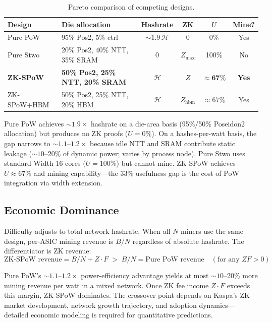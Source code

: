 \documentclass[11pt,a4paper]{article}
\begin{document}
\begin{table}[h]
\centering
\small
\begin{tabular}{@{}llcccc@{}}
\toprule
Design & Die allocation & Hashrate & ZK & $U$ & Mine? \\
\midrule
Pure PoW & 95\% Pos2, 5\% ctrl & ${\sim}1.9\,\mathcal{H}$ & 0 & 0\% & Yes \\
Pure Stwo & 20\% Pos2, 40\% NTT, 35\% SRAM & 0 & $Z_{\max}$ & 100\% & No \\
\textbf{ZK-SPoW} & \textbf{50\% Pos2, 25\% NTT, 20\% SRAM} & $\mathcal{H}$ & $Z$ & $\mathbf{{\approx}67\%}$ & \textbf{Yes} \\
ZK-SPoW+HBM & 50\% Pos2, 25\% NTT, 20\% HBM & $\mathcal{H}$ & $Z_{\mathrm{hbm}}$ & ${\approx}67\%$ & Yes \\
\bottomrule
\end{tabular}
\caption{Pareto comparison of competing designs.}
\label{tab:pareto}
\end{table}

Pure PoW achieves ${\sim}1.9\times$ hashrate on a die-area basis (95\%/50\% Poseidon2 allocation) but produces no ZK proofs ($U = 0\%$). On a hashes-per-watt basis, the gap narrows to ${\sim}1.1$--$1.2\times$ because idle NTT and SRAM contribute static leakage (${\sim}10$--$20\%$ of dynamic power; varies by process node). Pure Stwo uses standard Width-16 cores ($U = 100\%$) but cannot mine. ZK-SPoW achieves $U \approx 67\%$ and mining capability---the 33\% usefulness gap is the cost of PoW integration via width extension.

\subsection{Economic Dominance}
\label{sec:econ}

Difficulty adjusts to total network hashrate. When all $N$ miners use the same design, per-ASIC mining revenue is $B/N$ regardless of absolute hashrate. The differentiator is ZK revenue:
\[
\text{ZK-SPoW revenue} = B/N + Z \cdot F \;>\; B/N = \text{Pure PoW revenue} \quad (\text{for any } ZF > 0)
\]

Pure PoW's ${\sim}1.1$--$1.2\times$ power-efficiency advantage yields at most ${\sim}10$--$20\%$ more mining revenue per watt in a mixed network. Once ZK fee income $Z \cdot F$ exceeds this margin, ZK-SPoW dominates. The crossover point depends on Kaspa's ZK market development, network growth trajectory, and adoption dynamics---detailed economic modeling is required for quantitative predictions.
\end{document}
